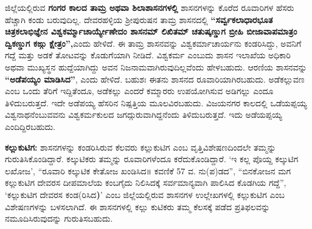 \vskip 3pt

ಜಿಲ್ಲೆಯಲ್ಲಿರುವ \textbf{ಗಂಗರ ಕಾಲದ ತಾಮ್ರ ಅಥವಾ ಶಿಲಾಶಾಸನಗಳಲ್ಲಿ} ಶಾಸನಗಳನ್ನು ಕೊರೆದ ರೂವಾರಿಗಳ ಹೆಸರು ಹೆಚ್ಚಾಗಿ ಕಂಡು ಬರುವುದಿಲ್ಲ. ದೇವರಹಳ್ಳಿಯ ಶ‍್ರೀಪುರುಷನ ತಾಮ್ರ ಶಾಸನದಲ್ಲಿ \textbf{“ಸರ್ವ್ವಕಲಾಧಾರಭೂತ ಚಿತ್ರಕಲಾಭಿಜ್ಞೇನ ವಿಶ್ವಕರ್ಮ್ಮಾಚಾರ್ಯ್ಯೇಣೇದಂ ಶಾಸನಮ್ ಲಿಖಿತಮ್ ಚತುಷ್ಕಣ್ಡುಗ ಬ್ರೀಹಿ ಬೀಜಾವಾಪಮಾತ್ರಂ ದ್ವಿಕಣ್ಡುಗ ಕಙ್ಗು ಕ್ಷೇತ್ರಂ”,}ಎಂದು ಹೇಳಿದೆ. ಈ ತಾಮ್ರ ಶಾಸನವನ್ನು ವಿಶ್ವಕರ್ಮಾಚಾರ್ಯನು ಕಂಡರಿಸಿದ್ದು, ಅವನಿಗೆ ಗದ್ದೆ ಮತ್ತು ಅಡಕೆ ತೋಟವನ್ನು ಕೊಡುಗೆಯಾಗಿ ನೀಡಿದೆ. ವಿಶ್ವಕರ್ಮ ಎಂಬುದು ಶಾಸನ ಇಲಾಖೆಯ ಅಧಿಕಾರಿ ಅಥವಾ ಮುಖ್ಯಸ್ಥನ ಹುದ್ದೆಯಾಗಿದ್ದು ಅವನ ನಿಜನಾಮವಾಗಿರುವುದಿಲ್ಲವೆಂದು ಹೇಳಬಹುದು. ಆರಣಿಯ ಶಾಸನವನ್ನು \textbf{“ಅಡೆಪಯ್ಯಂ ಮಾಡಿಸಿದ”}, ಎಂದು ಹೇಳಿದೆ. ಬಹುಶಃ ಈತನು ಶಾಸನದ ರೂವಾರಿಯಾಗಿರಬಹುದು. ಅಡೆಕಲ್ಲುವಣ ಎಂಬ ಒಂದು ತೆರಿಗೆ ಇದ್ದಿತೆಂದೂ, ಅಡೆಕಲ್ಲು ಎಂದರೆ ಕಮ್ಮಾರರು ಉಪಯೋಗಿಸುವ ಅಡಿಗಲ್ಲು ಎಂದೂ ತಿಳಿದುಬರುತ್ತದೆ. ಇದೇ ಅಡೆಪಯ್ಯ ಹೆಸರಿನ ನಿಷ್ಪತ್ತಿಯ ಮೂಲವಿರಬಹುದು. ವಿಜಯನಗರ ಕಾಲದಲ್ಲಿ ಒಡೆಯಪ್ಪಯ್ಯ ವಿಶ್ವನಾಥನೆಂಬುವವನು ವಿಶ್ವಕರ್ಮಕುಲದ ಜಗದ್ಗುರುವಾಗಿದ್ದನೆಂದು ತಿಳಿದುಬರುತ್ತದೆ. ಇದು ಅಡೆಯಪ್ಪಯ್ಯ ಎಂದಿದ್ದಿರಬಹುದು.

\vskip 3pt

\textbf{ಕಲ್ಲುಕುಟಿಗ:} ಶಾಸನಗಳನ್ನು ಕಂಡರಿಸಿರುವ ಕೆಲವರು ಕಲ್ಲುಕುಟಿಗ ಎಂಬ ವೃತ್ತಿವಿಶೇಷಣದಿಂದಲೇ ತಮ್ಮನ್ನು ಗುರುತಿಸಿಕೊಂಡಿದ್ದಾರೆ. ಕಲ್ಕುಟಿಕರು ತಮ್ಮನ್ನು ರೂವಾರಿಗಳೆಂದೂ ಕರೆದುಕೊಂಡಿದ್ದಾರೆ. ‘ಇ ಕಲ್ಲ ಪೊಯ್ದ ಕಲ್ಕುಟಿಗ ಲಖೋಜ’, “ರೂವಾರಿ ಕಲ್ಕುಟಿಕ ಕೇತೋಜ ಖಂಡಿಸಿದ॥ ಕವಣಿಕೆ 57 ವ. ನು(ಪ)ಡದ”, “ಬಿನಕೋಜನ ಮಗ ಕಲ್ಲುಕುಟಿಗ ದೇವರಸ ದೀಪಮಾಲೆಯ ಕಂಬಗೈದು ನಿಲಿಸಿದಕ್ಕೆ ಸರ್ವಮಾನ್ಯವಾಗಿ ಪಾಲಿಸಿದ ಕೊಡಗಿಯ ಗದ್ದೆ”, ‘ಕಲ್ಲುಕುಟಿಗ ದೇವರಸ ಕಂಡ(ರಿಸಿದ\textbf{)}’ ಎಂಬ ಜಿಲ್ಲೆಯಲ್ಲಿರುವ ಶಾಸನಗಳ ಉಲ್ಲೇಖಗಳಲ್ಲಿ ಕಲ್ಲುಕುಟಿಗ ಎಂಬ ವಿಶೇಷಣಗಳನ್ನು ಬಳಸಲಾಗಿದೆ. ಈ ಶಾಸನಗಳಲ್ಲಿ ಕಲ್ಲು ಕುಟಿಕರು ತಮ್ಮ ಕೆಲಸಕ್ಕೆ ಪಡೆದ ಪ್ರತಿಫಲವನ್ನು ನಮೂದಿಸಿರುವುದನ್ನು ಗುರುತಿಸಬಹುದು.

\vskip 3pt

